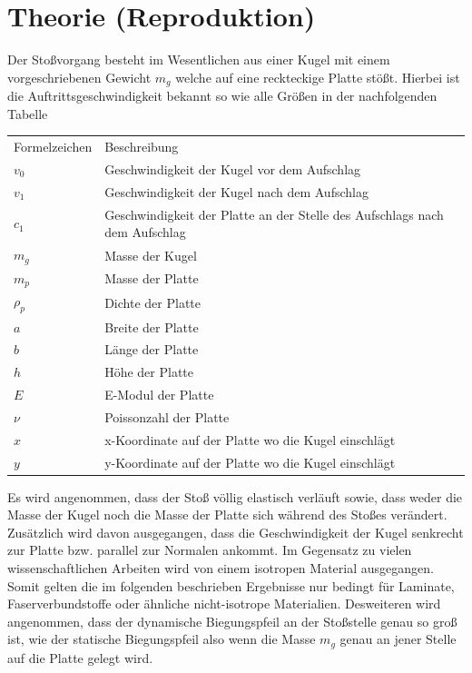 \chapter{Theorie (Reproduktion)}
\label{chap:Principles}

Der Stoßvorgang besteht im Wesentlichen aus einer Kugel mit einem vorgeschriebenen Gewicht $m_g$ welche auf eine reckteckige Platte stößt. Hierbei ist die Auftrittsgeschwindigkeit bekannt so wie alle Größen in der nachfolgenden Tabelle

\begin{tabular}[h]{l | l}
	Formelzeichen & Beschreibung \\
	$v_0$ & Geschwindigkeit der Kugel vor dem Aufschlag \\
	$v_1$ & Geschwindigkeit der Kugel nach dem Aufschlag \\
	$c_1$ & Geschwindigkeit der Platte an der Stelle des Aufschlags nach dem Aufschlag \\
	$m_g$ & Masse der Kugel \\
	$m_p$ & Masse der Platte\\
	$\rho_p$ & Dichte der Platte\\
	$a$ & Breite der Platte\\
	$b$ & Länge der Platte\\
	$h$ & Höhe der Platte \\
	$E$ & E-Modul der Platte \\
	$\nu$ & Poissonzahl der Platte \\
	$x$ & x-Koordinate auf der Platte wo die Kugel einschlägt \\
	$y$ & y-Koordinate auf der Platte wo die Kugel einschlägt \\
\end{tabular}

Es wird angenommen, dass der Stoß völlig elastisch verläuft sowie, dass weder die Masse der Kugel noch die Masse der Platte sich während des Stoßes verändert.
Zusätzlich wird davon ausgegangen, dass die Geschwindigkeit der Kugel senkrecht zur Platte bzw. parallel zur Normalen ankommt. Im Gegensatz zu vielen wissenschaftlichen Arbeiten wird von einem isotropen Material ausgegangen. Somit gelten die im folgenden beschrieben Ergebnisse nur bedingt für Laminate, Faserverbundstoffe oder ähnliche nicht-isotrope Materialien. Desweiteren wird angenommen, dass der dynamische Biegungspfeil an der Stoßstelle genau so groß ist, wie der statische Biegungspfeil also wenn die Masse $m_g$ genau an jener Stelle auf die Platte gelegt wird.

